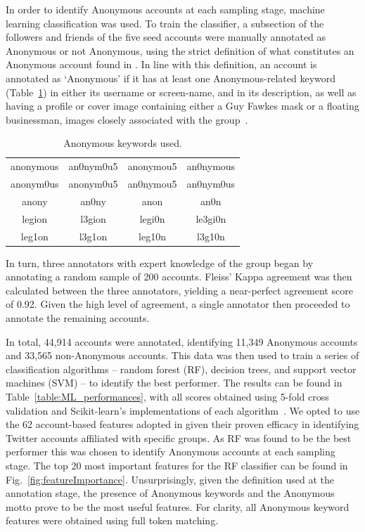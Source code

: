 \documentclass[letterpaper]{article}
\begin{document}
In order to identify Anonymous accounts at each sampling stage, machine learning classification was used. To train the classifier, a subsection of the followers and friends of the five seed accounts were manually annotated as Anonymous or not Anonymous, using the strict definition of what constitutes an Anonymous account found in \cite{Jones2020}. In line with this definition, an account is annotated as `Anonymous' if it has at least one Anonymous-related keyword (Table~\ref{table:keywords}) in either its username or screen-name, and in its description, as well as having a profile or cover image containing either a Guy Fawkes mask or a floating businessman, images closely associated with the group~\cite{Olson2013}.

\begin{table}[!tbh]
\footnotesize
\centering
\begin{tabular}{ c c c c }
 \toprule
 anonymous & an0nym0u5 & anonymou5 & an0nymous \\
 anonym0us & anonym0u5 & an0nymou5 & an0nym0us \\ 
 anony & an0ny & anon & an0n\\ 
 legion & l3gion & legi0n & le3gi0n\\
     leg1on & l3g1on & leg10n & l3g10n\\
 \bottomrule
\end{tabular}
\caption{Anonymous keywords used.}
\label{table:keywords}
\end{table}

In turn, three annotators with expert knowledge of the group began by annotating a random sample of 200 accounts. Fleiss' Kappa agreement was then calculated between the three annotators, yielding a near-perfect agreement score of 0.92. Given the high level of agreement, a single annotator then proceeded to annotate the remaining accounts.

In total, 44,914 accounts were annotated, identifying 11,349 Anonymous accounts and 33,565 non-Anonymous accounts. This data was then used to train a series of classification algorithms -- random forest (RF), decision trees, and support vector machines (SVM) -- to identify the best performer. The results can be found in Table~\ref{table:ML_performances}, with all scores obtained using 5-fold cross validation and Scikit-learn's implementations of each algorithm~\cite{Pedregosa2011}. We opted to use the 62 account-based features adopted in \cite{Jones2020} given their proven efficacy in identifying Twitter accounts affiliated with specific groups. As RF was found to be the best performer this was chosen to identify Anonymous accounts at each sampling stage. The top 20 most important features for the RF classifier can be found in Fig.~\ref{fig:featureImportance}. Unsurprisingly, given the definition used at the annotation stage, the presence of Anonymous keywords and the Anonymous motto prove to be the most useful features. For clarity, all Anonymous keyword features were obtained using full token matching.
\end{document}

